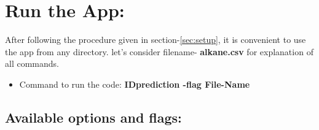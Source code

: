 \documentclass[12pt]{article}
\begin{document}
\newpage

\section{Run the App:} \label{sec:run}
	After following the procedure given in section-\ref{sec:setup}, it is convenient to use the app from any directory. let's consider filename- \textbf{alkane.csv} for explanation of all commands.  
	\begin{itemize}
		\item Command to run the code:
		\subsubitem \textbf{IDprediction -flag File-Name }
	\end{itemize}
	\subsection{Available options and flags:}
	\vspace{0.4cm}
	\noindent
	
\end{document}

